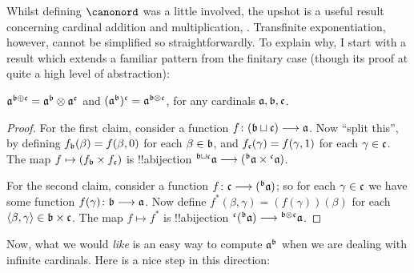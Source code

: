 \documentclass[../../../include/open-logic-section]{subfiles}
\begin{document}


Whilst defining $\canonord$ was a little involved, the upshot is a
useful result concerning cardinal addition and multiplication,
. Transfinite exponentiation, however,
cannot be simplified so straightforwardly. To explain why, I start
with a result which extends a familiar pattern from the finitary case
(though its proof  at quite a high level of abstraction):

\begin{prop}
$\mathfrak{a}^{\mathfrak{b} \oplus \mathfrak{c}} =
\mathfrak{a}^{\mathfrak{b}} \otimes
\mathfrak{a}^{\mathfrak{c}}$ and
$(\mathfrak{a}^{\mathfrak{b}})^{\mathfrak{c}} =
\mathfrak{a}^{\mathfrak{b} \otimes \mathfrak{c}}$, for
any cardinals $\mathfrak{a}, \mathfrak{b}, \mathfrak{c}$.
\end{prop}

\begin{proof}
For the first claim, consider a function $f \colon
(\mathfrak{b}\sqcup\mathfrak{c}) \longrightarrow \mathfrak{a}$. Now ``split
this'', by defining $f_{\mathfrak{b}}(\beta) = f(\beta, 0)$ for each
$\beta \in \mathfrak{b}$, and $f_{\mathfrak{c}}(\gamma) = f(\gamma, 1)$
for each $\gamma \in \mathfrak{c}$. The map $f \mapsto
(f_{\mathfrak{b}} \times f_{\mathfrak{c}})$ is !!a{bijection}
${}^{\mathfrak{b} \sqcup \mathfrak{c}}{\mathfrak{a}} \longrightarrow
({}^{\mathfrak{b}}{\mathfrak{a}} \times
{}^{\mathfrak{c}}{\mathfrak{a}})$. 

For the second claim, consider a function $f \colon \mathfrak{c} \longrightarrow
({}^{\mathfrak{b}}{\mathfrak{a}})$; so for each $\gamma \in
\mathfrak{c}$ we have some function $f(\gamma) \colon \mathfrak{b} \longrightarrow
\mathfrak{a}$. Now define $f^*(\beta, \gamma) = (f(\gamma))(\beta)$
for each $\langle \beta, \gamma \rangle \in \mathfrak{b} \times \mathfrak{c}$.
The map $f \mapsto f^*$ is !!a{bijection}
${}^{\mathfrak{c}}{({}^{\mathfrak{b}}{\mathfrak{a}})}
\longrightarrow {}^{\mathfrak{b} \otimes \mathfrak{c}}{\mathfrak{a}}$. 
\end{proof}

Now, what we would \emph{like} is an easy way to compute
$\mathfrak{a}^{\mathfrak{b}}$ when we are dealing with
infinite cardinals. Here is a nice step in this direction:
\end{document}
